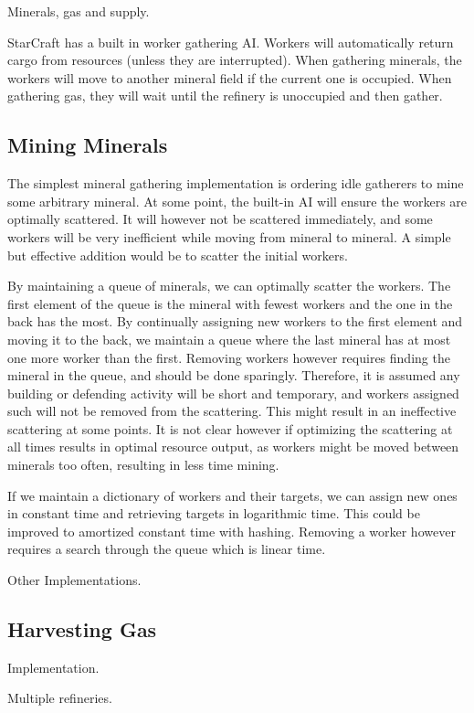 Minerals, gas and supply.

StarCraft has a built in worker gathering AI. Workers will automatically return cargo from resources (unless they are interrupted). When gathering minerals, the workers will move to another mineral field if the current one is occupied. When gathering gas, they will wait until the refinery is unoccupied and then gather.

	\subsection*{Mining Minerals}
	The simplest mineral gathering implementation is ordering idle gatherers to mine some arbitrary mineral. At some point, the built-in AI will ensure the workers are optimally scattered. It will however not be scattered immediately, and some workers will be very inefficient while moving from mineral to mineral. A simple but effective addition would be to scatter the initial workers.
	
	By maintaining a queue of minerals, we can optimally scatter the workers. The first element of the queue is the mineral with fewest workers and the one in the back has the most. By continually assigning new workers to the first element and moving it to the back, we maintain a queue where the last mineral has at most one more worker than the first. Removing workers however requires finding the mineral in the queue, and should be done sparingly. Therefore, it is assumed any building or defending activity will be short and temporary, and workers assigned such will not be removed from the scattering. This might result in an ineffective scattering at some points. It is not clear however if optimizing the scattering at all times results in optimal resource output, as workers might be moved between minerals too often, resulting in less time mining.
	
	If we maintain a dictionary of workers and their targets, we can assign new ones in constant time and retrieving targets in logarithmic time. This could be improved to amortized constant time with hashing. Removing a worker however requires a search through the queue which is linear time.

	Other Implementations.

	\subsection*{Harvesting Gas}	
	Implementation.
	
	Multiple refineries.

